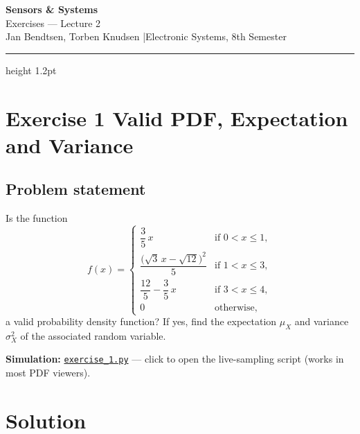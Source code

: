 \documentclass[12pt, a4paper]{article}
\begin{document}
\begin{center}
  {\LARGE\bfseries\color{headernavy} Sensors \& Systems}\\[4pt]
  {\large Exercises --- Lecture 2}\\[2pt]
  {\normalsize Jan Bendtsen, Torben Knudsen \quad|\quad Electronic Systems, 8th Semester}
\end{center}

\vspace{4pt}
\hrule height 1.2pt
\vspace{12pt}

\section*{Exercise 1 \quad Valid PDF, Expectation and Variance}

\subsection*{Problem statement}

Is the function
\[
  f(x) =
  \begin{cases}
    \dfrac{3}{5}\,x & \text{if } 0 < x \leq 1,\\[8pt]
    \dfrac{\bigl(\sqrt{3}\,x - \sqrt{12}\bigr)^2}{5} & \text{if } 1 < x \leq 3,\\[8pt]
    \dfrac{12}{5} - \dfrac{3}{5}\,x & \text{if } 3 < x \leq 4,\\[6pt]
    0 & \text{otherwise,}
  \end{cases}
\]
a valid probability density function?  If yes, find the expectation $\mu_X$
and variance $\sigma_X^2$ of the associated random variable.

\medskip
\textbf{Simulation:} \href{run:exercise_1.py}{\texttt{exercise\_1.py}} ---
click to open the live-sampling script (works in most PDF viewers).

\section*{Solution}
\end{document}
